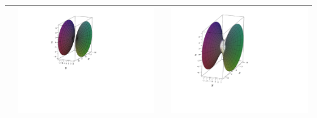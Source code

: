 \documentclass[12pt]{article}
\begin{document}
\begin{enumerate}
\begin{center}
\begin{tabular}{|lc|lc|}
&\includegraphics[scale=0.5]{matching2.pdf}&&\includegraphics[scale=0.4]{matching6.pdf}\\
\hline
\end{tabular}
\end{center}

\end{enumerate}
\end{document}
